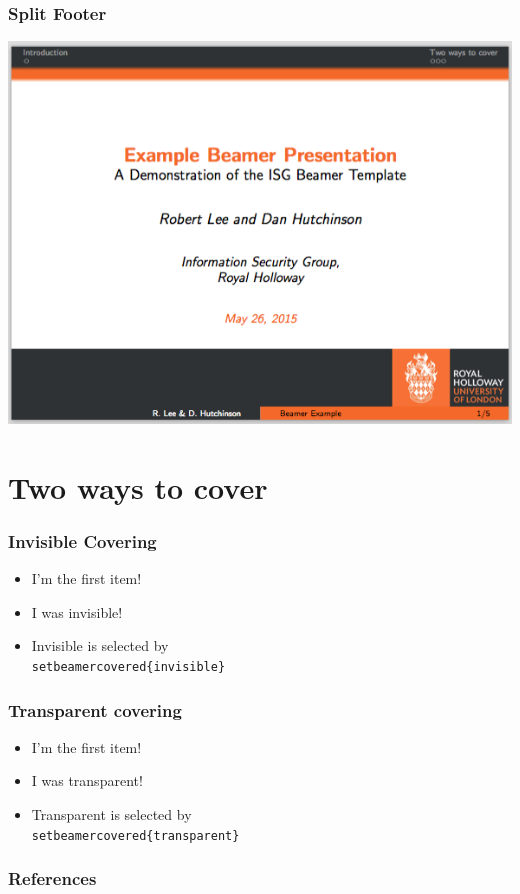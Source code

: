 \documentclass{beamer}
\begin{document}
\begin{frame}\frametitle{Split Footer}
\begin{center}
	\includegraphics[scale=0.4]{graphics/split-footer.png}
\end{center}
\end{frame}

\section{Two ways to cover}
\begin{frame}\frametitle{Invisible Covering}
\begin{itemize}
\item{I'm the first item!}
\pause
\item{I was invisible!}
\pause
\item Invisible is selected by \texttt{\\setbeamercovered\{invisible\}}
\end{itemize}
\end{frame}


\begin{frame}\frametitle{Transparent covering}
\begin{itemize}
\item{I'm the first item!}
\pause
\item{I was transparent!}
\pause
\item Transparent is selected by \texttt{\\setbeamercovered\{transparent\}}
\end{itemize}
\end{frame}

\begin{frame}[t,allowframebreaks]
\frametitle{References}

\end{frame}
\end{document}
